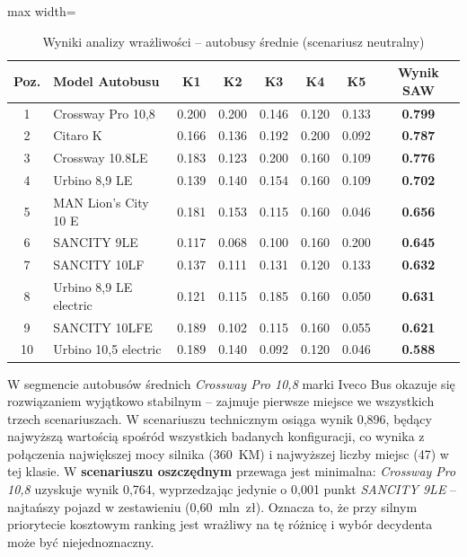 \begin{table}[H]
    \centering
    \caption{Wyniki analizy wrażliwości -- autobusy średnie (scenariusz neutralny)}
    \vspace{0.2cm}
    \begin{adjustbox}{max width=\textwidth}
    \begin{tabular}{|c|l|c|c|c|c|c|c|}
        \hline
        \textbf{Poz.} & \textbf{Model Autobusu} & \textbf{K1} & \textbf{K2} & \textbf{K3} & \textbf{K4} & \textbf{K5} & \textbf{Wynik SAW} \\ \hline
        1 & Crossway Pro 10,8      & 0.200 & 0.200 & 0.146 & 0.120 & 0.133 & \textbf{0.799} \\ \hline
        2 & Citaro K               & 0.166 & 0.136 & 0.192 & 0.200 & 0.092 & \textbf{0.787} \\ \hline
        3 & Crossway 10.8LE        & 0.183 & 0.123 & 0.200 & 0.160 & 0.109 & \textbf{0.776} \\ \hline
        4 & Urbino 8,9 LE          & 0.139 & 0.140 & 0.154 & 0.160 & 0.109 & \textbf{0.702} \\ \hline
        5 & MAN Lion's City 10 E   & 0.181 & 0.153 & 0.115 & 0.160 & 0.046 & \textbf{0.656} \\ \hline
        6 & SANCITY 9LE            & 0.117 & 0.068 & 0.100 & 0.160 & 0.200 & \textbf{0.645} \\ \hline
        7 & SANCITY 10LF           & 0.137 & 0.111 & 0.131 & 0.120 & 0.133 & \textbf{0.632} \\ \hline
        8 & Urbino 8,9 LE electric & 0.121 & 0.115 & 0.185 & 0.160 & 0.050 & \textbf{0.631} \\ \hline
        9 & SANCITY 10LFE          & 0.189 & 0.102 & 0.115 & 0.160 & 0.055 & \textbf{0.621} \\ \hline
        10 & Urbino 10,5 electric  & 0.189 & 0.140 & 0.092 & 0.120 & 0.046 & \textbf{0.588} \\ \hline
    \end{tabular}
    \end{adjustbox}
\end{table}

W segmencie autobusów średnich \textit{Crossway Pro 10,8} marki Iveco Bus okazuje się rozwiązaniem wyjątkowo stabilnym -- zajmuje pierwsze miejsce we wszystkich trzech scenariuszach. W scenariuszu technicznym osiąga wynik 0,896, będący najwyższą wartością spośród wszystkich badanych konfiguracji, co wynika z połączenia największej mocy silnika (360~KM) i najwyższej liczby miejsc (47) w tej klasie. W \textbf{scenariuszu oszczędnym} przewaga jest minimalna: \textit{Crossway Pro 10,8} uzyskuje wynik 0,764, wyprzedzając jedynie o 0,001 punkt \textit{SANCITY 9LE} -- najtańszy pojazd w zestawieniu (0,60~mln~zł). Oznacza to, że przy silnym priorytecie kosztowym ranking jest wrażliwy na tę różnicę i wybór decydenta może być niejednoznaczny.


